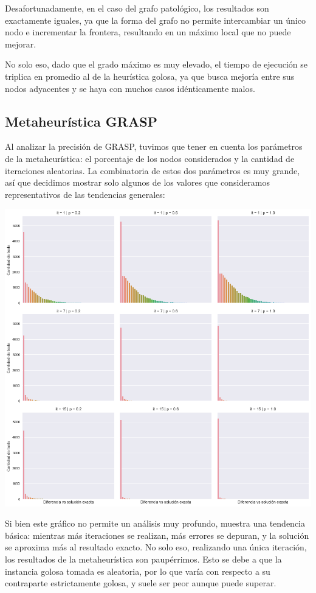 Desafortunadamente, en el caso del grafo patológico, los resultados son exactamente iguales, ya que la forma del grafo no permite intercambiar un único nodo e incrementar la frontera, resultando en un máximo local que no puede mejorar.

No solo eso, dado que el grado máximo es muy elevado, el tiempo de ejecución se triplica en promedio al de la heurística golosa, ya que busca mejoría entre sus nodos adyacentes y se haya con muchos casos idénticamente malos.

\subsection*{Metaheurística GRASP}

Al analizar la precisión de GRASP, tuvimos que tener en cuenta los parámetros de la metaheurística: el porcentaje de los nodos considerados y la cantidad de iteraciones aleatorias. La combinatoria de estos dos parámetros es muy grande, así que decidimos mostrar solo algunos de los valores que consideramos representativos de las tendencias generales:

\begin{center}
    \includegraphics[scale=0.6]{img/accuracy-grasp-3x3.png}
\end{center}

Si bien este gráfico no permite un análisis muy profundo, muestra una tendencia básica: mientras más iteraciones se realizan, más errores se depuran, y la solución se aproxima más al resultado exacto. No solo eso, realizando una única iteración, los resultados de la metaheurística son paupérrimos. Esto se debe a que la instancia golosa tomada es aleatoria, por lo que varía con respecto a su contraparte estrictamente golosa, y suele ser peor aunque puede superar.

